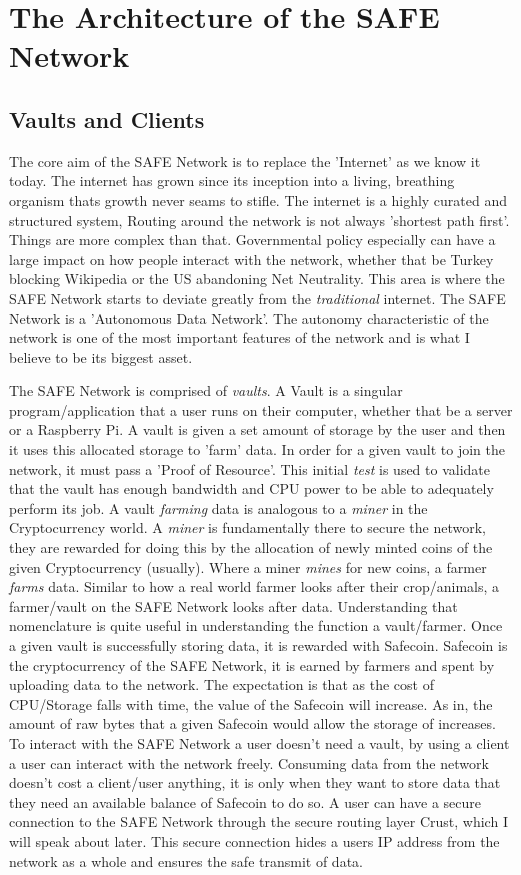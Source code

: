 \chapter{The Architecture of the SAFE Network}
\label{ch:architecture}

\section{Vaults and Clients}

The core aim of the SAFE Network is to replace the 'Internet' as we know it today. The internet has grown since its inception into a living, breathing organism thats growth never seams to stifle. The internet is a highly curated and structured system, Routing around the network is not always 'shortest path first'. Things are more complex than that. Governmental policy especially can have a large impact on how people interact with the network, whether that be Turkey blocking Wikipedia or the US abandoning Net Neutrality. This area is where the SAFE Network starts to deviate greatly from the \textit{traditional} internet. The SAFE Network is a 'Autonomous Data Network'. The autonomy characteristic of the network is one of the most important features of the network and is what I believe to be its biggest asset.

The SAFE Network is comprised of \textit{vaults}. A Vault is a singular program/application that a user runs on their computer, whether that be a server or a Raspberry Pi. A vault is given a set amount of storage by the user and then it uses this allocated storage to 'farm' data. In order for a given vault to join the network, it must pass a 'Proof of Resource'. This initial \textit{test} is used to validate that the vault has enough bandwidth and CPU power to be able to adequately perform its job. A vault \textit{farming} data is analogous to a \textit{miner} in the Cryptocurrency world. A \textit{miner} is fundamentally there to secure the network, they are rewarded for doing this by the allocation of newly minted coins of the given Cryptocurrency (usually). Where a miner \textit{mines} for new coins, a farmer \textit{farms} data. Similar to how a real world farmer looks after their crop/animals, a farmer/vault on the SAFE Network looks after data. Understanding that nomenclature is quite useful in understanding the function a vault/farmer. Once a given vault is successfully storing data, it is rewarded with Safecoin. Safecoin is the cryptocurrency of the SAFE Network, it is earned by farmers and spent by uploading data to the network. The expectation is that as the cost of CPU/Storage falls with time, the value of the Safecoin will increase. As in, the amount of raw bytes that a given Safecoin would allow the storage of increases. To interact with the SAFE Network a user doesn't need a vault, by using a client a user can interact with the network freely. Consuming data from the network doesn't cost a client/user anything, it is only when they want to store data that they need an available balance of Safecoin to do so. A user can have a secure connection to the SAFE Network through the secure routing layer Crust, which I will speak about later. This secure connection hides a users IP address from the network as a whole and ensures the safe transmit of data.

